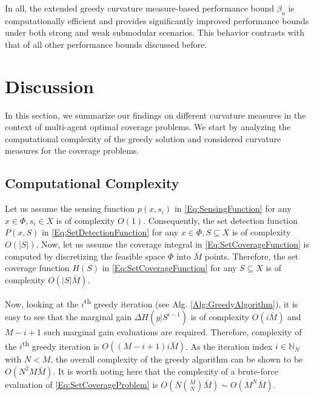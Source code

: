 \documentclass[letterpaper, 10 pt, conference]{ieeeconf}
\newcommand{\N}{\mathbb{N}}
\newcommand{\tsup}[1]{\textsuperscript{#1}}
\begin{document}
In all, the extended greedy curvature measure-based performance bound $\beta_u$ is computationally efficient and provides significantly improved performance bounds under both strong and weak submodular scenarios. This behavior contrasts with that of all other performance bounds discussed before. 



\section{Discussion}\label{Sec:Discussion}


In this section, we summarize our findings on different curvature measures in the context of multi-agent optimal coverage problems. We start by analyzing the computational complexity of the greedy solution and considered curvature measures for the coverage problems. 


\subsection{Computational Complexity}
Let us assume the sensing function $p(x,s_i)$ in \eqref{Eq:SensingFunction} for any $x\in \Phi, s_i \in X$ is of complexity $O(1)$. Consequently, the set detection function $P(x,S)$ in \eqref{Eq:SetDetectionFunction} for any $x \in \Phi, S \subseteq X$ is of complexity $O(\vert S \vert)$. Now, let us assume the coverage integral in \eqref{Eq:SetCoverageFunction} is computed by discretizing the feasible space $\Phi$ into $\bar{M}$ points. Therefore, the set coverage function $H(S)$ in \eqref{Eq:SetCoverageFunction} for any $S\subseteq X$ is of complexity $O(\vert S \vert \bar{M})$. 


Now, looking at the $i$\tsup{th} greedy iteration (see Alg. \ref{Alg:GreedyAlgorithm}), it is easy to see that the marginal gain $\Delta H (y\vert S^{i-1})$ is of complexity $O(i\bar{M})$ and $M-i+1$ such marginal gain evaluations are required. Therefore, complexity of the $i$\tsup{th} greedy iteration is $O((M-i+1)i\bar{M})$. As the iteration index $i \in \N_N$ with $N<M$, the overall complexity of the greedy algorithm can be shown to be $O(N^2 M \bar{M})$. It is worth noting here that the complexity of a brute-force evaluation of \eqref{Eq:SetCoverageProblem} is $O(N{M \choose N}\bar{M}) \sim O(M^N \bar{M})$. 
\end{document}
